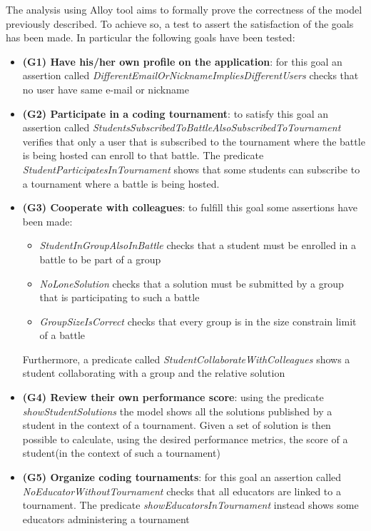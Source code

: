 \documentclass[../RASD.tex]{subfiles}
\begin{document}
The analysis using Alloy tool aims to formally prove the correctness of the model previously described.
To achieve so, a test to assert the satisfaction of the goals has been made.
In particular the following goals have been tested:
\begin{itemize}
    \item {\textbf{(G1) Have his/her own profile on the application}: for this goal an assertion called \textit{DifferentEmailOrNicknameImpliesDifferentUsers} checks that no user have same e-mail or nickname}
    \item {\textbf{(G2) Participate in a coding tournament}: to satisfy this goal an assertion called \textit{StudentsSubscribedToBattleAlsoSubscribedToTournament} verifies that only a user that is subscribed to the tournament where the battle is being hosted can enroll to that battle.
    The predicate \textit{StudentParticipatesInTournament} shows that some students can subscribe to a tournament where a battle is being hosted.}
    \item {\textbf{(G3) Cooperate with colleagues}: to fulfill this goal some assertions have been made:
    \begin{itemize}
        \item \textit{StudentInGroupAlsoInBattle} checks that a student must be enrolled in a battle to be part of a group
        \item \textit{NoLoneSolution} checks that a solution must be submitted by a group that is participating to such a battle
        \item \textit{GroupSizeIsCorrect} checks that every group is in the size constrain limit of a battle
    \end{itemize}
    Furthermore, a predicate called \textit{StudentCollaborateWithColleagues} shows a student collaborating with a group and the relative solution}
    \item {\textbf{(G4) Review their own performance score}: using the predicate \textit{showStudentSolutions} the model shows all the solutions published by a student in the context of a tournament.
    Given a set of solution is then possible to calculate, using the desired performance metrics, the score of a student(in the context of such a tournament)}
    \item {\textbf{(G5) Organize coding tournaments}: for this goal an assertion called \textit{NoEducatorWithoutTournament} checks that all educators are linked to a tournament.
    The predicate \textit{showEducatorsInTournament} instead shows some educators administering a tournament}

\end{itemize}
\end{document}
